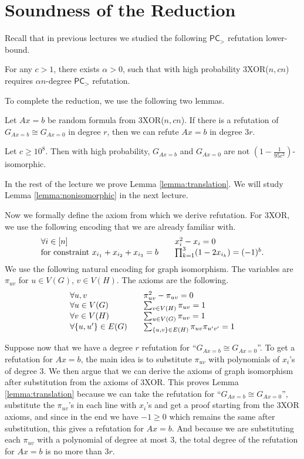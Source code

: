 \documentclass[a4paper,twoside,justified]{tufte-handout}
\begin{document}
\section{Soundness of the Reduction}
Recall that in previous lectures we studied the following $\mathsf{PC}_{>}$ refutation lower-bound.
\begin{lemma}
  For any $c>1$, there exists $\alpha>0$, such that with high probability
  3XOR($n,cn$) requires $\alpha n$-degree $\mathsf{PC}_{>}$ refutation.
\end{lemma}
To complete the reduction, we use the following two lemmas.
\begin{lemma}\label{lemma:translation}
  Let $Ax=b$ be random formula from 3XOR($n,cn$). If there is a refutation of $G_{Ax=b} \cong G_{Ax=0}$
  in degree $r$, then we can refute $Ax=b$ in degree $3r$.
\end{lemma}
\begin{lemma}\label{lemma:nonisomorphic}
  Let $c \ge 10^8$. Then with high probability, $G_{Ax=b}$ and $G_{Ax=0}$ are not $\left( 1-\frac{1}{95c^2} \right)$-isomorphic.
\end{lemma}
In the rest of the lecture we prove Lemma \ref{lemma:translation}. We will study Lemma \ref{lemma:nonisomorphic} in
the next lecture.

Now we formally define the axiom from which we derive refutation.
For 3XOR, we use the following encoding that we are already familiar with.
\[
\left.
\begin{array}{l l}
  \forall i \in [n] &\quad x_i^2-x_i = 0 \\
  \textrm{for constraint } x_{i_1}+x_{i_2}+x_{i_3}=b &\quad \prod_{k=1}^{3}(1-2x_{i_k})=(-1)^b.
\end{array}
\right.
\]
We use the following natural encoding for graph isomorphism. The variables are
$\pi_{uv}$ for $u \in V(G)$, $v \in V(H)$. The axioms are the following.
\[
\left.
\begin{array}{l l}
  \forall u, v &\quad \pi_{uv}^2-\pi_{uv}=0 \\
  \forall u \in V(G) &\quad \sum_{v \in V(H)}\pi_{uv}=1 \\
  \forall v \in V(H) &\quad \sum_{u \in V(G)}\pi_{uv}=1 \\
  \forall \{u,u'\} \in E(G) &\quad \sum_{\{u,v\} \in E(H)} \pi_{uv}\pi_{u'v'}=1
\end{array}
\right.
\]

Suppose now that we have a degree $r$ refutation for ``$G_{Ax=b} \cong G_{Ax=0}$''.
To get a refutation for $Ax=b$, the main idea is to substitute $\pi_{uv}$ with
polynomials of $x_i$'s of degree 3. We then argue that we can derive the axioms of
graph isomorphism after substitution from the axioms of 3XOR. This proves Lemma \ref{lemma:translation}
because we can take the refutation for ``$G_{Ax=b} \cong G_{Ax=0}$'', substitute the $\pi_{uv}$'s in each
line with $x_i$'s and get a proof starting from the 3XOR axioms, and since in the end we have $-1 \ge 0$
which remains the same after substitution, this gives a refutation for $Ax=b$. And because we are substituting
each $\pi_{uv}$ with a polynomial of degree at most 3, the total degree of the refutation for $Ax=b$ is no more than
$3r$.
\end{document}
